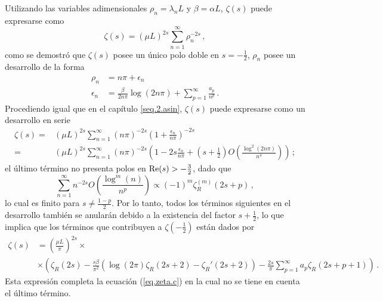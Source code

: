 Utilizando las variables adimensionales $\rho _n = \lambda _n L$ y $\beta = \alpha L$, $\zeta (s)$ puede expresarse como
\begin{equation*}
\zeta (s) = \left( \mu L \right) ^{2s} \sum _{n=1} ^{\infty} \rho _n ^{-2s} 
\, ,
\end{equation*}
como se demostró que $\zeta (s)$ posee un único polo doble en $s = -\frac{1}{2}$, $\rho _n$ posee un desarrollo de la forma
\begin{equation}
\begin{aligned}
\rho _n  &= 
			n \pi + \epsilon _n \\
			\epsilon _n &= 
			\frac{ \beta }{2 n \pi } \log (2 n \pi) +
			\sum _{p=1} ^{\infty} \frac{a _p}{n ^p }
			\, .
\end{aligned}
\end{equation}
Procediendo igual que en el capítulo \ref{seq.2.asin}, $\zeta (s)$ puede expresarse como un desarrollo en serie
\begin{align}
\zeta (s) =& 
( \mu L ) ^{2s}
\sum _{n=1} ^{\infty}
( n \pi) ^{-2s} \left( 1 + \frac{ \epsilon _n }{n \pi } \right) ^{-2s } \\
\nonumber
 =& 
(\mu L) ^{2s} \sum _{n=1} ^{\infty}
( n \pi) ^{-2s} \left(
						1 -2s  \frac{\epsilon _n}{n \pi} + 
						\left( s + \frac{1}{2} \right) 
						O \left( \frac{ \log ^2 ( 2 n \pi ) }{ n ^4} \right)  
						\right)
\, ;
\end{align}
el último término no presenta polos en \mbox{${\rm Re}(s) >- \frac{3}{2}$}, dado que
\begin{equation} 
	\sum _{n=1} ^{\infty}
	 n  ^{-2s} O \left( \frac{ \log ^m (n)}{ n ^p} \right)
	\propto 
		(-1) ^m \zeta _R ^{(m)} (2s+p) 
\, ,
\end{equation}
lo cual es finito para $s \neq \frac{1-p}{2}$.
Por lo tanto, todos los términos siguientes en el desarrollo también se anularán debido a la existencia del factor $s + \frac{1}{2}$, lo que implica que los términos que contribuyen a $\zeta \left( - \frac{1}{2} \right)$ están dados por
\begin{align}
\zeta (s) &= \left( \frac{\mu L}{\pi} \right) ^{2s} \times \\
			\nonumber
			&\times
			\left(
					\zeta _R (2s) - \frac{s \beta}{\pi ^2} 
						\left(
							\log (2 \pi ) \zeta _R (2s+2) - \zeta _R '(2s+2)
							\right)-
					\frac{2 s}{\pi} \sum _{p=1} ^{\infty}
						a _p \zeta _R (2s+p+1)
					\right)
\, .					
\end{align}
Esta expresión completa la ecuación (\ref{eq.zeta.c}) en  la cual no se tiene en cuenta el último término.
